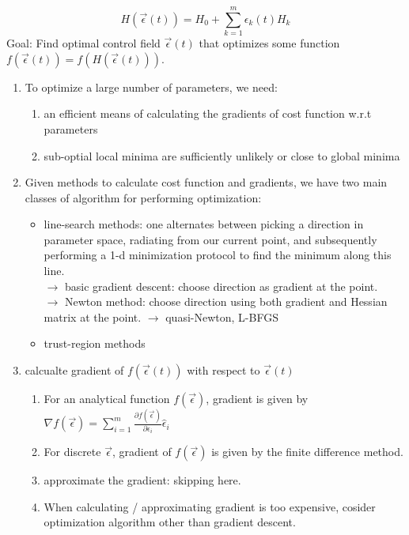 \documentclass{article}
\begin{document}
\begin{equation}
    H(\vec{\epsilon}(t)) = H_0 + \sum_{k=1}^m \epsilon_k(t) H_k
\end{equation}
Goal: Find optimal control field $\vec{\epsilon}(t)$ that optimizes some function $f(\vec{\epsilon}(t)) = f(H(\vec{\epsilon}(t)))$. \\
\begin{enumerate}
    \item To optimize a large number of parameters, we need:
        \begin{enumerate}
            \item an efficient means of calculating the gradients of cost function w.r.t parameters
            \item sub-optial local minima are sufficiently unlikely or close to global minima
        \end{enumerate}
    \item Given methods to calculate cost function and gradients, we have two main classes of algorithm for performing optimization: 
        \begin{itemize}
            \item line-search methods: one alternates between picking a direction in parameter space, radiating from our current point, and subsequently performing a 1-d minimization protocol to find the minimum along this line. \\
                $\rightarrow$ basic gradient descent: choose direction as gradient at the point. \\
                $\rightarrow$ Newton method: choose direction using both gradient and Hessian matrix at the point. $\rightarrow$ quasi-Newton, L-BFGS
            \item trust-region methods
        \end{itemize}
    \item calcualte gradient of $f(\vec{\epsilon}(t))$ with respect to $\vec{\epsilon}(t)$
        \begin{enumerate}
            \item For an analytical function $f(\vec{\epsilon})$, gradient is given by $\nabla f(\vec{\epsilon}) = \sum_{i=1}^m \frac{\partial f(\vec{\epsilon})}{\partial \epsilon_i} \hat{\epsilon}_i$
            \item For discrete $\vec{\epsilon}$, gradient of $f(\vec{\epsilon})$ is given by the finite difference method.
            \item approximate the gradient: skipping here.
            \item When calculating / approximating gradient is too expensive, cosider optimization algorithm other than gradient descent.

\end{enumerate}
\end{enumerate}
\end{document}

